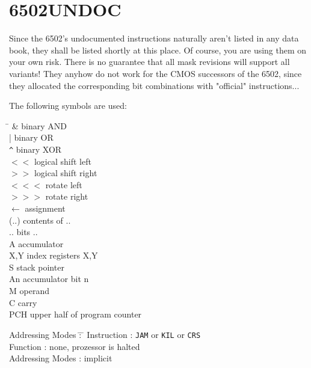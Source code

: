 \documentclass[12pt,twoside]{report}
\newcommand{\tty}[1]{{\tt #1}}
\begin{document}

\section{6502UNDOC}

Since the 6502's undocumented instructions naturally aren't listed in
any data book, they shall be listed shortly at this place.  Of
course, you are using them on your own risk.  There is no guarantee
that all mask revisions will support all variants!  They anyhow do
not work for the CMOS successors of the 6502, since they allocated
the corresponding bit combinations with "official" instructions...

The following symbols are used:

\begin{tabbing}
\hspace{2cm} \= \kill
\&           \> binary AND \\
|            \> binary OR \\
\verb!^!     \> binary XOR \\
$<<$         \> logical shift left \\
$>>$         \> logical shift right \\
$<<<$        \> rotate left \\
$>>>$        \> rotate right \\
$\leftarrow$ \> assignment \\
 (..)        \> contents of .. \\
 {..}        \> bits .. \\
 A           \> accumulator \\
 X,Y         \> index registers X,Y \\
 S           \> stack pointer \\
 An          \> accumulator bit n \\
 M           \> operand \\
 C           \> carry \\
 PCH         \> upper half of program counter \\
\end{tabbing}

\begin{tabbing}
Addressing Modes \= : \= \kill
Instruction      \> : \> \tty{JAM} or \tty{KIL} or \tty{CRS} \\
Function         \> : \> none, prozessor is halted \\
Addressing Modes \> : \> implicit \\
\end{tabbing}
\end{document}
